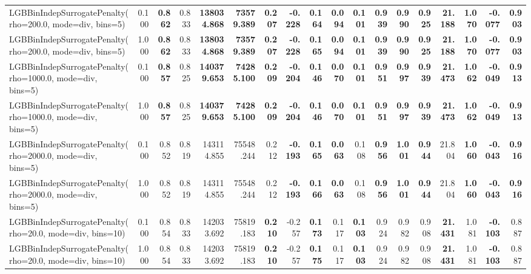 \documentclass[11pt]{article}
\theoremstyle{plain}
\theoremstyle{definition}
\newcommand{\1}{\mathbf{1}}
\begin{document}
\begin{table}[htbp]
{\begin{tabular}{lrrrrrrrrrrrrrrrrr}
LGBBinIndepSurrogatePenalty(rho=200.0, mode=div, bins=5) & 0.100 & \textbf{0.862} & 0.833 & \textbf{138034.868} & \textbf{73579.389} & \textbf{0.207} & \textbf{-0.228} & \textbf{0.164} & \textbf{0.094} & \textbf{0.101} & \textbf{0.939} & \textbf{0.990} & \textbf{0.925} & \textbf{21.188} & \textbf{1.070} & \textbf{-0.077} & \textbf{0.903} \\
LGBBinIndepSurrogatePenalty(rho=200.0, mode=div, bins=5) & 1.000 & \textbf{0.862} & 0.833 & \textbf{138034.868} & \textbf{73579.389} & \textbf{0.207} & \textbf{-0.228} & \textbf{0.165} & \textbf{0.094} & \textbf{0.101} & \textbf{0.939} & \textbf{0.990} & \textbf{0.925} & \textbf{21.188} & \textbf{1.070} & \textbf{-0.077} & \textbf{0.903} \\
LGBBinIndepSurrogatePenalty(rho=1000.0, mode=div, bins=5) & 0.100 & \textbf{0.857} & 0.825 & \textbf{140379.653} & \textbf{74285.100} & \textbf{0.209} & \textbf{-0.204} & \textbf{0.146} & \textbf{0.070} & \textbf{0.101} & \textbf{0.951} & \textbf{0.997} & \textbf{0.939} & \textbf{21.473} & \textbf{1.062} & \textbf{-0.049} & \textbf{0.913} \\
LGBBinIndepSurrogatePenalty(rho=1000.0, mode=div, bins=5) & 1.000 & \textbf{0.857} & 0.825 & \textbf{140379.653} & \textbf{74285.100} & \textbf{0.209} & \textbf{-0.204} & \textbf{0.146} & \textbf{0.070} & \textbf{0.101} & \textbf{0.951} & \textbf{0.997} & \textbf{0.939} & \textbf{21.473} & \textbf{1.062} & \textbf{-0.049} & \textbf{0.913} \\
LGBBinIndepSurrogatePenalty(rho=2000.0, mode=div, bins=5) & 0.100 & 0.852 & 0.819 & 143114.855 & 75548.244 & 0.212 & \textbf{-0.193} & \textbf{0.165} & \textbf{0.063} & 0.108 & \textbf{0.956} & \textbf{1.001} & \textbf{0.944} & 21.804 & \textbf{1.060} & \textbf{-0.043} & \textbf{0.916} \\
LGBBinIndepSurrogatePenalty(rho=2000.0, mode=div, bins=5) & 1.000 & 0.852 & 0.819 & 143114.855 & 75548.244 & 0.212 & \textbf{-0.193} & \textbf{0.166} & \textbf{0.063} & 0.108 & \textbf{0.956} & \textbf{1.001} & \textbf{0.944} & 21.804 & \textbf{1.060} & \textbf{-0.043} & \textbf{0.916} \\
LGBBinIndepSurrogatePenalty(rho=20.0, mode=div, bins=10) & 0.100 & 0.854 & 0.833 & 142033.692 & 75819.183 & \textbf{0.210} & -0.257 & \textbf{0.173} & 0.117 & \textbf{0.103} & 0.924 & 0.982 & 0.908 & \textbf{21.431} & 1.081 & \textbf{-0.103} & 0.887 \\
LGBBinIndepSurrogatePenalty(rho=20.0, mode=div, bins=10) & 1.000 & 0.854 & 0.833 & 142033.692 & 75819.183 & \textbf{0.210} & -0.257 & \textbf{0.175} & 0.117 & \textbf{0.103} & 0.924 & 0.982 & 0.908 & \textbf{21.431} & 1.081 & \textbf{-0.103} & 0.887 \\

\end{tabular}}
\end{table}
\end{document}
